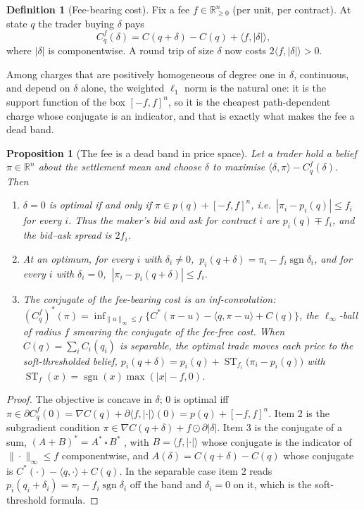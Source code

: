 \documentclass[11pt]{article}
\newtheorem{proposition}[theorem]{Proposition}
\theoremstyle{definition}
\newtheorem{definition}[theorem]{Definition}
\theoremstyle{remark}
\newcommand{\R}{\mathbb{R}}
\newcommand{\ip}[2]{\langle #1,#2\rangle}
\newcommand{\ST}{\operatorname{ST}}
\newcommand{\sgn}{\operatorname{sgn}}
\begin{document}
\begin{definition}[Fee-bearing cost]
Fix a fee $f\in\R^{n}_{\ge0}$ (per unit, per contract). At state $q$ the trader buying $\delta$ pays
\begin{equation}\label{eq:feecost}
C^{f}_{q}(\delta)=C(q+\delta)-C(q)+\ip{f}{|\delta|},
\end{equation}
where $|\delta|$ is componentwise. A round trip of size $\delta$ now costs $2\ip{f}{|\delta|}>0$.
\end{definition}

Among charges that are positively homogeneous of degree one in $\delta$, continuous, and depend on $\delta$ alone,
the weighted $\ell_1$ norm is the natural one: it is the support function of the box $[-f,f]^n$, so it is the
cheapest path-dependent charge whose conjugate is an indicator, and that is exactly what makes the fee a dead band.

\begin{proposition}[The fee is a dead band in price space]\label{prop:band}
Let a trader hold a belief $\pi\in\R^{n}$ about the settlement mean and choose $\delta$ to maximise
$\ip{\delta}{\pi}-C^{f}_{q}(\delta)$. Then
\begin{enumerate}[leftmargin=2em,itemsep=0pt]
\item $\delta=0$ is optimal if and only if $\pi\in p(q)+[-f,f]^{n}$, i.e.\ $|\pi_i-p_i(q)|\le f_i$ for every $i$.
Thus the maker's bid and ask for contract $i$ are $p_i(q)\mp f_i$, and the bid--ask spread is $2f_i$.
\item At an optimum, for every $i$ with $\delta_i\ne0$, $\ p_i(q+\delta)=\pi_i-f_i\sgn\delta_i$, and for every $i$
with $\delta_i=0$, $\ |\pi_i-p_i(q+\delta)|\le f_i$.
\item The conjugate of the fee-bearing cost is an inf-convolution:
$(C^{f}_{q})^{*}(\pi)=\inf_{\|u\|_\infty\le f}\big\{C^{*}(\pi-u)-\ip{q}{\pi-u}+C(q)\big\}$, the $\ell_\infty$-ball
of radius $f$ smearing the conjugate of the fee-free cost. When $C(q)=\sum_iC_i(q_i)$ is separable, the optimal trade moves each price to the
soft-thresholded belief, $p_i(q+\delta)=p_i(q)+\ST_{f_i}\big(\pi_i-p_i(q)\big)$ with $\ST_f(x)=\sgn(x)\max(|x|-f,0)$.
\end{enumerate}
\end{proposition}

\begin{proof}
The objective is concave in $\delta$; $0$ is optimal iff $\pi\in\partial C^{f}_{q}(0)=\nabla C(q)+\partial\ip{f}{|\cdot|}(0)
=p(q)+[-f,f]^{n}$. Item 2 is the subgradient condition $\pi\in\nabla C(q+\delta)+f\odot\partial|\delta|$. Item 3 is
the conjugate of a sum, $(A+B)^{*}=A^{*}\,\square\,B^{*}$ \citep[Thm.\ 16.4]{rockafellar1970}, with $B=\ip{f}{|\cdot|}$
whose conjugate is the indicator of $\|\cdot\|_\infty\le f$ componentwise, and $A(\delta)=C(q+\delta)-C(q)$ whose
conjugate is $C^{*}(\cdot)-\ip{q}{\cdot}+C(q)$. In the separable case item 2 reads $p_i(q_i+\delta_i)=\pi_i-f_i\sgn\delta_i$ off the band and $\delta_i=0$ on it,
which is the soft-threshold formula.
\end{proof}
\end{document}
